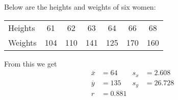 \documentclass[../mathNotesPreamble]{subfiles}
\begin{document}
    \begin{ex*}
      Below are the heights and weights of six women:
        \begin{center}
          \begin{tabular}{@{}l*{6}{c}@{}}\toprule
            Heights& 61& 62& 63& 64& 66& 68\\
            Weights& 104& 110& 141& 125& 170& 160\\\bottomrule
          \end{tabular}
        \end{center}
      From this we get
        \begin{align*}
          \overline{x}&=64 & s_x&=2.608 \\
          \overline{y}&=135 & s_y&=26.728 \\
          r&=0.881
        \end{align*}
    \end{ex*}
\end{document}
